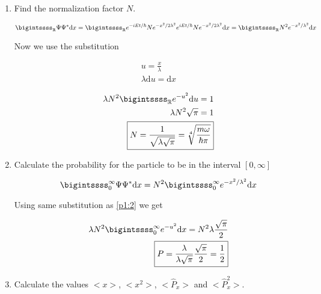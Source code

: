 \documentclass[11pt,letterpaper]{article}%
\newcommand{\dx}{\mathrm{d}x}
\begin{document}
\begin{enumerate}
[label=\Large{\textbf{\arabic*.}}]
\item
{
Find the normalization factor $N$.

\begin{equation}
\label{p1:1}
\bigintssss_{\mathbb{R}}\Psi\Psi^*\dx = \bigintssss_{\mathbb{R}}e^{-iEt/\hbar}Ne^{-x^2/2\lambda^2}e^{iEt/\hbar}Ne^{-x^2/2\lambda^2}\dx = \bigintssss_{\mathbb{R}}N^2e^{-x^2/\lambda^2}\dx
\end{equation}

Now we use the substitution

\begin{equation}
\label{p1:2}
\begin{split}
u = \frac{x}{\lambda}\\
\lambda\mathrm{d}u = \dx
\end{split}
\end{equation}

\begin{equation}
\label{p1:3}
\begin{split}
\lambda N^2\bigintssss_{\mathbb{R}}e^{-u^2}\mathrm{d}u = 1\\
\lambda N^2\sqrt{\pi} = 1\\
\boxed{N = \frac{1}{\sqrt{\lambda \sqrt{\pi}}} = \sqrt[4]{\frac{m\omega}{\hbar\pi}}}
\end{split}
\end{equation}
}

\item
{
Calculate the probability for the particle to be in the interval $[0,\infty]$

\begin{equation}
\label{p2:1}
\bigintssss_0^{\infty}\Psi\Psi^*\dx = N^2\bigintssss_0^{\infty}e^{-x^2/\lambda^2}\dx
\end{equation}

Using same substitution as \eqref{p1:2} we get

\begin{equation}
\label{p2:2}
\begin{split}
\lambda N^2\bigintssss_0^{\infty}e^{-u^2}\dx = N^2\lambda\frac{\sqrt{\pi}}{2}\\
\boxed{P = \frac{\lambda}{\lambda\sqrt{\pi}}\frac{\sqrt{\pi}}{2} = \frac{1}{2}}
\end{split}
\end{equation}
}

\item
{
Calculate the values $\big<x\big>$, $\big<x^2\big>$, $\big<\hat{P}_x\big>$ and $\big<\hat{P}_x^2\big>$.

}
\end{enumerate}
\end{document}
